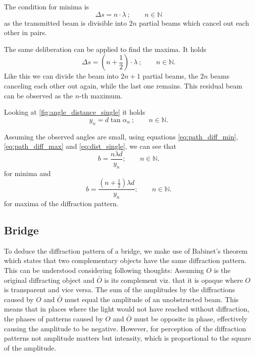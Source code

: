 The condition for minima is
\begin{equation}\label{eq:path_diff_min}
	\Delta s = n\cdot\lambda\ ;\qquad n\in\mathbb{N}
\end{equation}
as the transmitted beam is divisible into $2n$ partial beams which cancel out each other in pairs.

The same deliberation can be applied to find the maxima.
It holds
\begin{equation}\label{eq:path_diff_max}
	\Delta s = \left(n+\frac{1}{2}\right)\cdot\lambda\ ;\qquad n\in\mathbb{N}.
\end{equation}
Like this we can divide the beam into $2n+1$ partial beams, the $2n$ beams canceling each other out again, while the last one remains.
This residual beam can be observed as the $n$-th maximum.

Looking at \autoref{fig:angle_distance_single} it holds
\begin{equation}\label{eq:dist_single}
	y_n = d\tan\alpha_n\ ;\qquad n\in\mathbb{N}.
\end{equation}

Assuming the observed angles are small, using equations \ref{eq:path_diff_min}, \ref{eq:path_diff_max} and \ref{eq:dist_single}, we can see that
\begin{equation}\label{eq:single_slit_minima}
	b = \frac{n\lambda d}{y_n} ;\qquad n\in\mathbb{N}.
\end{equation}
for minima and
\begin{equation}\label{eq:single_slit_maxima}
	b = \frac{\left(n+\frac{1}{2}\right)\lambda d}{y_n} ;\qquad n\in\mathbb{N}.
\end{equation}
for maxima of the diffraction pattern.

\subsection{Bridge}\label{subsec:bridge}
To deduce the diffraction pattern of a bridge, we make use of Babinet's theorem which states that two complementary objects have the same diffraction pattern.
This can be understood considering following thoughts:
Assuming $O$ is the original diffracting object and $\bar{O}$ is its complement viz. that it is opaque where $O$ is transparent and vice versa.
The sum of the amplitudes by the diffractions caused by $O$ and $\bar{O}$ must equal the amplitude of an unobstructed beam.
This means that in places where the light would not have reached without diffraction, the phases of patterns caused by $O$ and $\bar{O}$ must be opposite in phase, effectively causing the amplitude to be negative.
However, for perception of the diffraction patterns not amplitude matters but intensity, which is proportional to the square of the amplitude.

